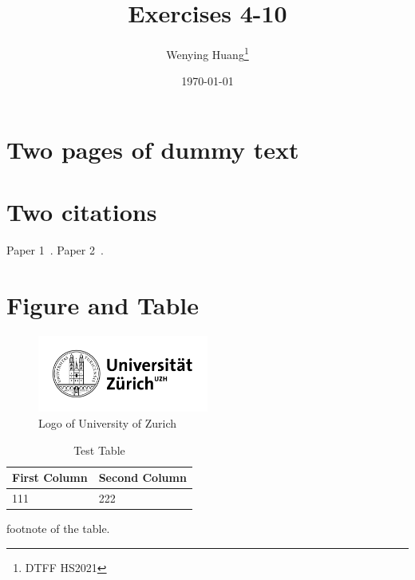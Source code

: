 \documentclass{article}
\title{Exercises 4-10}
\author[1]{Wenying Huang\thanks{DTFF HS2021}}
\affil[1]{University of Zurich}
\date{\today}
\begin{document}
\maketitle

\begin{abstract}
    \blindtext
\end{abstract}
\newpage

\section{Two pages of dummy text}
\blindtext[7]

\newpage

\section{Two citations}
Paper 1~\cite{kozlowski2020tail}. Paper 2~\cite{gormsen2020coronavirus}.

\section{Figure and Table}
\begin{figure}[h]
\centering
\includegraphics[width=0.5\textwidth]{800px-UZH-logo.png}
\caption{Logo of University of Zurich}
\end{figure}

\begin{table}[h]
\centering
\caption{Test Table}
\begin{threeparttable}
\begin{tabular}{ll}
\toprule
First Column & Second Column \\
\midrule
111 & 222 \\
\bottomrule
\end{tabular}
\begin{tablenotes}
\item *footnote of the table.
\end{tablenotes}
\end{threeparttable}
\end{table}

\clearpage
\printbibliography
\end{document}
